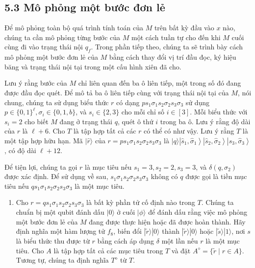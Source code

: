 \documentclass[10pt]{article}
\begin{document}
\subsection*{5.3 Mô phỏng một bước đơn lẻ}
Để mô phỏng toàn bộ quá trình tính toán của $M$ trên bất kỳ đầu vào $x$ nào, chúng ta cần mô phỏng từng bước của $M$ một cách tuần tự cho đến khi $M$ cuối cùng đi vào trạng thái nội $q_{f}$. Trong phần tiếp theo, chúng ta sẽ trình bày cách mô phỏng một bước đơn lẻ của $M$ bằng cách thay đổi vị trí đầu đọc, ký hiệu băng và trạng thái nội tại trong một cấu hình xiên đã cho.

Lưu ý rằng bước của $M$ chỉ liên quan đến ba ô liên tiếp, một trong số đó đang được đầu đọc quét. Để mô tả ba ô liên tiếp cùng với trạng thái nội tại của $M$, nói chung, chúng ta sử dụng biểu thức $r$ có dạng $p s_{1} \sigma_{1} s_{2} \sigma_{2} s_{3} \sigma_{3}$ sử dụng $p \in\{0,1\}^{\ell}, \sigma_{i} \in\{0,1, b\}$, và $s_{i} \in\{2,3\}$ cho mỗi chỉ số $i \in[3]$. Mỗi biểu thức với $s_{i}=2$ cho biết $M$ đang ở trạng thái $q$, quét ô thứ $i$ trong ba ô. Lưu ý rằng độ dài của $r$ là $\ell+6$. Cho $T$ là tập hợp tất cả các $r$ có thể có như vậy. Lưu ý rằng $T$ là một tập hợp hữu hạn. Mã $|\hat{r}\rangle$ của $r=p s_{1} \sigma_{1} s_{2} \sigma_{2} s_{3} \sigma_{3}$ là $|q\rangle\left|\hat{s}_{1}, \hat{\sigma}_{1}\right\rangle\left|\hat{s}_{2}, \hat{\sigma}_{2}\right\rangle\left|\hat{s}_{3}, \hat{\sigma}_{3}\right\rangle$, có độ dài $\ell+12$.

Để tiện lợi, chúng ta gọi $r$ là mục tiêu nếu $s_{1}=3, s_{2}=2, s_{3}=3$, và $\delta\left(q, \sigma_{2}\right)$ được xác định. Để sử dụng về sau, $s_{1} \sigma_{1} s_{2} \sigma_{2} s_{3} \sigma_{3}$ không có $q$ được gọi là tiền mục tiêu nếu $q s_{1} \sigma_{1} s_{2} \sigma_{2} s_{3} \sigma_{3}$ là một mục tiêu.

\begin{enumerate}
  \item Cho $r=q s_{1} \sigma_{1} s_{2} \sigma_{2} s_{3} \sigma_{3}$ là bất kỳ phần tử cố định nào trong $T$. Chúng ta chuẩn bị một qubit đánh dấu $|0\rangle$ ở cuối $|\phi\rangle$ để đánh dấu rằng việc mô phỏng một bước đơn lẻ của $M$ đang được thực hiện hoặc đã được hoàn thành. Hãy định nghĩa một hàm lượng tử $f_{8}$, biến đổi $|\tilde{r}\rangle|0\rangle$ thành $|\tilde{r}\rangle|0\rangle$ hoặc $|\tilde{s}\rangle|1\rangle$, nơi $s$ là biểu thức thu được từ $r$ bằng cách áp dụng $\delta$ một lần nếu $r$ là một mục tiêu. Cho $A$ là tập hợp tất cả các mục tiêu trong $T$ và đặt $A^{\diamond}=\{\tilde{r} \mid r \in A\}$. Tương tự, chúng ta định nghĩa $T^{\diamond}$ từ $T$.
\end{enumerate}
\end{document}
